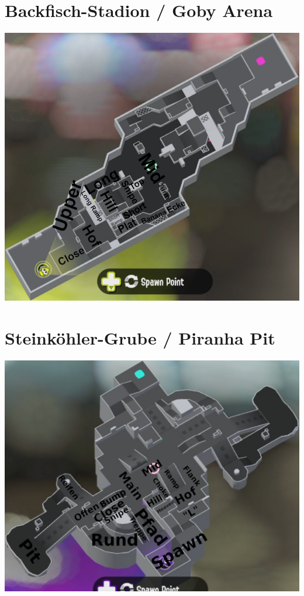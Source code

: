 \documentclass{scrreprt}
\begin{document}
\section{Backfisch-Stadion / Goby Arena}
\includegraphics[width=\linewidth]{img/gobyarena.png}
\section{Steinköhler-Grube / Piranha Pit}
\includegraphics[width=\linewidth]{img/piranhapit.png}
\end{document}
